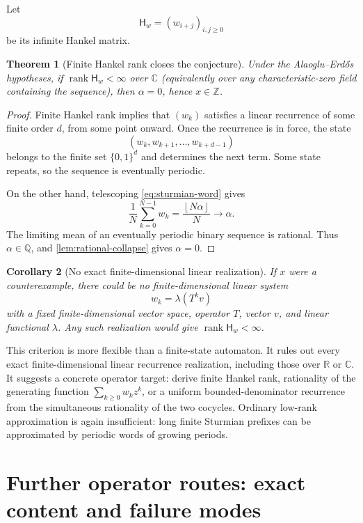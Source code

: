 \documentclass[11pt,oneside]{article}
\newtheorem{theorem}{Theorem}[section]
\newtheorem{corollary}[theorem]{Corollary}
\theoremstyle{definition}
\theoremstyle{remark}
\newcommand{\Z}{\mathbb Z}
\newcommand{\Q}{\mathbb Q}
\newcommand{\R}{\mathbb R}
\newcommand{\C}{\mathbb C}
\newcommand{\rank}{\operatorname{rank}}
\newcommand{\floor}[1]{\left\lfloor #1\right\rfloor}
\begin{document}
Let
\[
        \mathsf H_w=(w_{i+j})_{i,j\geq0}
\]
be its infinite Hankel matrix.

\begin{theorem}[Finite Hankel rank closes the conjecture]
\label{thm:hankel-closes}
Under the Alaoglu--Erd\H{o}s hypotheses, if
\(\rank\mathsf H_w<\infty\) over \(\C\) (equivalently over any
characteristic-zero field containing the sequence), then
\(\alpha=0\), hence \(x\in\Z\).
\end{theorem}

\begin{proof}
Finite Hankel rank implies that \((w_k)\) satisfies a linear recurrence
of some finite order \cite{Kailath,Peller} \(d\), from some point onward.  Once the recurrence
is in force, the state
\[
        (w_k,w_{k+1},\ldots,w_{k+d-1})
\]
belongs to the finite set \(\{0,1\}^d\) and determines the next term.
Some state repeats, so the sequence is eventually periodic.

On the other hand, telescoping \eqref{eq:sturmian-word} gives
\[
 \frac1N\sum_{k=0}^{N-1}w_k
 =\frac{\floor{N\alpha}}{N}
 \longrightarrow\alpha.
\]
The limiting mean of an eventually periodic binary sequence is rational.
Thus \(\alpha\in\Q\), and \cref{lem:rational-collapse} gives
\(\alpha=0\).
\end{proof}

\begin{corollary}[No exact finite-dimensional linear realization]
\label{cor:no-finite-realization}
If \(x\) were a counterexample, there could be no finite-dimensional
linear system
\[
        w_k=\lambda(T^kv)
\]
with a fixed finite-dimensional vector space, operator \(T\), vector
\(v\), and linear functional \(\lambda\).  Any such realization would
give \(\rank\mathsf H_w<\infty\).
\end{corollary}

This criterion is more flexible than a finite-state automaton.  It rules
out every exact finite-dimensional linear recurrence realization,
including those over \(\R\) or \(\C\).  It suggests a concrete operator
target: derive finite Hankel rank, rationality of the generating function
\(\sum_{k\geq0}w_kz^k\), or a uniform bounded-denominator recurrence from
the simultaneous rationality of the two cocycles.  Ordinary low-rank
approximation is again insufficient: long finite Sturmian prefixes can
be approximated by periodic words of growing periods.


\section{Further operator routes: exact content and failure modes}
\end{document}
